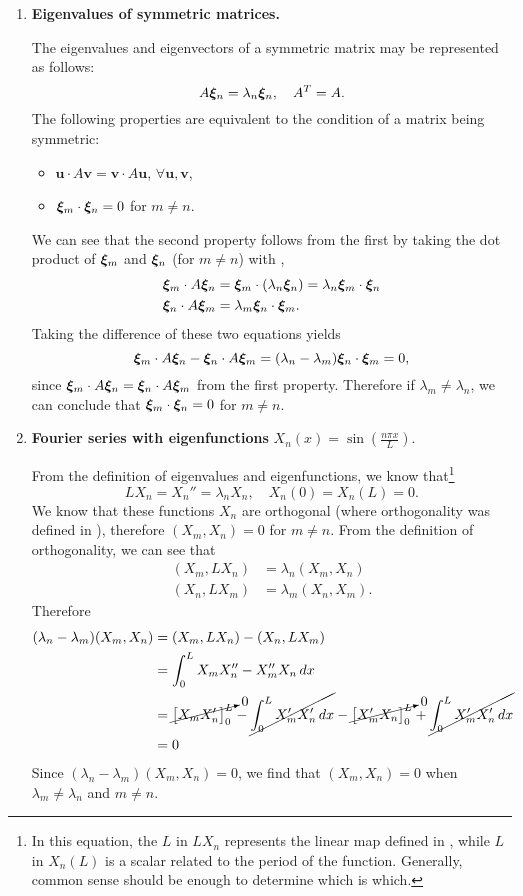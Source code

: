 \begin{enumerate}
	\item \textbf{Eigenvalues of symmetric matrices.}
	
	The eigenvalues and eigenvectors of a symmetric matrix may be represented as follows:
	\begin{equation}\label{eq:sleigs}
		A\bm{\xi}_n = \lambda_n\bm{\xi}_n, \quad A^T = A.
	\end{equation}
	The following properties are equivalent to the condition of a matrix being symmetric:
	\begin{itemize}
		\item $\bm{u} \cdot A\bm{v} = \bm{v} \cdot A\bm{u}$, $\forall \bm{u},\bm{v}$,
		\item $\bm{\xi}_m\cdot\bm{\xi}_n = 0$ for $m \neq n$.
	\end{itemize}
	We can see that the second property follows from the first by taking the dot product of $\bm{\xi}_m$ and $\bm{\xi}_n$ (for $m\neq n$) with ,
	\begin{align*}
		\bm{\xi}_m\cdot A\bm{\xi}_n &= \bm{\xi}_m\cdot(\lambda_n\bm{\xi}_n) = \lambda_n \bm{\xi}_m\cdot\bm{\xi}_n \\
		\bm{\xi}_n\cdot A\bm{\xi}_m &= \lambda_m \bm{\xi}_n\cdot\bm{\xi}_m.
	\end{align*}
	Taking the difference of these two equations yields
	\[
	\bm{\xi}_m\cdot A\bm{\xi}_n - \bm{\xi}_n\cdot A\bm{\xi}_m = (\lambda_n - \lambda_m)\bm{\xi}_n\cdot\bm{\xi}_m = 0,
	\]
	since $\bm{\xi}_m\cdot A\bm{\xi}_n = \bm{\xi}_n\cdot A\bm{\xi}_m$ from the first property. Therefore if $\lambda_m \neq \lambda_n$, we can conclude that $\bm{\xi}_m\cdot\bm{\xi}_n = 0$ for $m \neq n$.
	
	\item \textbf{Fourier series with eigenfunctions} $X_n(x) = \sin\left(\frac{n\pi x}{L}\right)$.
	
	From the definition of eigenvalues and eigenfunctions, we know that\footnote{In this equation, the $L$ in $LX_n$ represents the linear map defined in , while $L$ in $X_n(L)$ is a scalar related to the period of the function. Generally, common sense should be enough to determine which is which.}
	\[
	LX_n = X_n'' = \lambda_n X_n, \quad X_n(0) = X_n(L) = 0.
	\]
	We know that these functions $X_n$ are orthogonal (where orthogonality was defined in ), therefore $(X_m, X_n) = 0$ for $m \neq n$. From the definition of orthogonality, we can see that
	\begin{align*}
		(X_m, LX_n) &= \lambda_n (X_m, X_n) \\
		(X_n, LX_m) &= \lambda_m (X_n, X_m).
	\end{align*}
	Therefore
	\begin{align*}
		(\lambda_n - \lambda_m)(X_m, X_n) &= (X_m, LX_n) - (X_n, LX_m) \\
		&= \int_0^L X_mX_n'' - X_m''X_n\,dx \\
		&= \cancelto{0}{\left[X_mX_n'\right]_0^L} - \cancel{\int_0^LX_m'X_n' \,dx} - \cancelto{0}{\left[X_m'X_n\right]_0^L} + \cancel{\int_0^L X_m'X_n' \,dx} \\
		&= 0
	\end{align*}
	Since $(\lambda_n - \lambda_m)(X_m, X_n) = 0$, we find that $(X_m,X_n) = 0$ when $\lambda_m \neq \lambda_n$ and $m \neq n$.
	

\end{enumerate}
